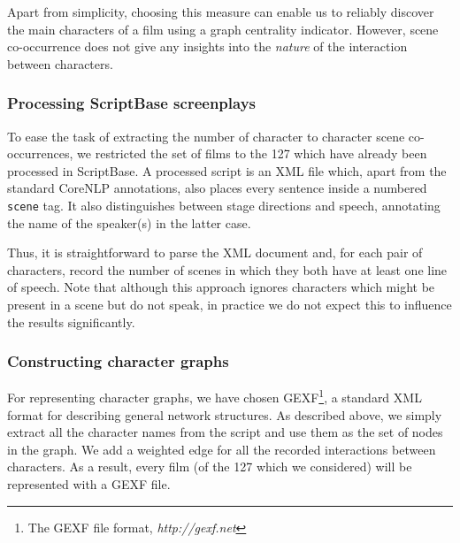 \documentclass[bsc,frontabs,singlespacing,parskip]{infthesis} %
\begin{document}
Apart from simplicity, choosing this measure can enable us to reliably discover the main characters of a film using a graph centrality indicator. However, scene co-occurrence does not give any insights into the \textit{nature} of the interaction between characters.

\subsubsection{Processing ScriptBase screenplays}
To ease the task of extracting the number of character to character scene co-occurrences, we restricted the set of films to the 127 which have already been processed in ScriptBase. A processed script is an XML file which, apart from the standard CoreNLP annotations, also places every sentence inside a numbered \texttt{scene} tag. It also distinguishes between stage directions and speech, annotating the name of the speaker(s) in the latter case.

Thus, it is straightforward to parse the XML document and, for each pair of characters, record the number of scenes in which they both have at least one line of speech. Note that although this approach ignores characters which might be present in a scene but do not speak, in practice we do not expect this to influence the results significantly.

\subsubsection{Constructing character graphs}
For representing character graphs, we have chosen GEXF\footnote{The GEXF file format, \textit{http://gexf.net}}, a standard XML format for describing general network structures. As described above, we simply extract all the character names from the script and use them as the set of nodes in the graph. We add a weighted edge for all the recorded interactions between characters. As a result, every film (of the 127 which we considered) will be represented with a GEXF file.
\end{document}
